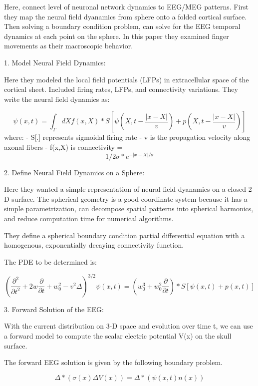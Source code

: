 \documentclass{article}
\begin{document}
Here, connect level of neuronal network dynamics to EEG/MEG patterns. First they map the neural field dyanamics from sphere onto a folded cortical surface. Then solving a boundary condition problem, can solve for the EEG temporal dynamics at each point on the sphere. In this paper they examined finger movements as their macroscopic behavior.

1. Model Neural Field Dynamics: 

Here they modeled the local field potentials (LFPs) in extracellular space of the cortical sheet. Included firing rates, LFPs, and connectivity variations. They write the neural field dynamics as:

\[
\psi{(x, t)} = \int_{\Gamma}dX f(x, X) * S[\psi{(X, t - \frac{|x - X|}{v})} + p(X, t - \frac{|x-X|}{v})]
\]
where:
- S[.] represents sigmoidal firing rate
- v is the propagation velocity along axonal fibers
- f(x,X) is connectivity  = \[1/2\sigma{} * e^{-|x-X|/\sigma{}}\]

2. Define Neural Field Dynamics on a Sphere:

Here they wanted a simple representation of neural field dyanamics on a closed 2-D surface. The spherical geometry is a good coordinate system because it has a simple parametrization, can decompose spatial patterns into spherical harmonics, and reduce computation time for numerical algorithms.

They define a spherical boundary condition partial differential equation with a homogenous, exponentially decaying connectivity function.

The PDE to be determined is:

\[(\frac{\partial^2}{\partial t^2} + 2w\frac{\partial}{\partial t} + w_0^2 - v^2\Delta)^{3/2} \psi{}(x,t) = (w_0^3 + w_0^2 \frac{\partial}{\partial t}) * S[\psi{(x,t)} + p(x,t)] \]

3. Forward Solution of the EEG:

With the current distribution on 3-D space and evolution over time t, we can use a forward model to compute the scalar electric potential V(x) on the skull surface.

The forward EEG solution is given by the following boundary problem. 

\[ \Delta * (\sigma{(x)}\Delta V(x)) = \Delta * (\psi{(x,t)}n(x))
\]



\newpage
\small
{
  
  
}
\end{document}
